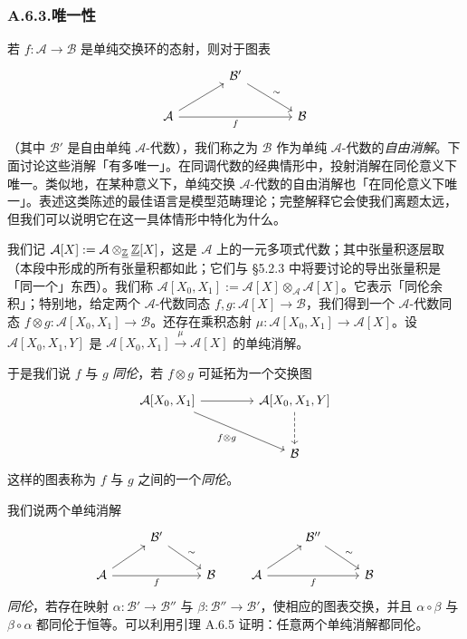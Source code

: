 \subsubsection*{A.6.3.\quad 唯一性}

若 $f\colon\mathcal A\to\mathcal B$ 是单纯交换环的态射，则对于图表
\[
\begin{tikzcd}[column sep=3.6em, row sep=1.8em]
& \mathcal B' \arrow[dr, "{\sim}"] & \\
\mathcal A \arrow[ur] \arrow[rr, "f"'] & & \mathcal B
\end{tikzcd}
\]
（其中 $\mathcal B'$ 是自由单纯 $\mathcal A$-代数），我们称之为 $\mathcal B$ 作为单纯 $\mathcal A$-代数的\emph{自由消解}。下面讨论这些消解「有多唯一」。在同调代数的经典情形中，投射消解在同伦意义下唯一。类似地，在某种意义下，单纯交换 $\mathcal A$-代数的自由消解也「在同伦意义下唯一」。表述这类陈述的最佳语言是模型范畴理论；完整解释它会使我们离题太远，但我们可以说明它在这一具体情形中特化为什么。

我们记 $\mathcal A[X]:=\mathcal A\otimes_{\underline{\mathbb{Z}}}\underline{\mathbb{Z}}[X]$，这是 $\mathcal A$ 上的一元多项式代数；其中张量积逐层取（本段中形成的所有张量积都如此；它们与 §5.2.3 中将要讨论的导出张量积是「同一个」东西）。我们称 $\mathcal A[X_0,X_1]:=\mathcal A[X]\otimes_{\mathcal A}\mathcal A[X]$。它表示「同伦余积」；特别地，给定两个 $\mathcal A$-代数同态 $f,g\colon\mathcal A[X]\to\mathcal B$，我们得到一个 $\mathcal A$-代数同态 $f\otimes g\colon\mathcal A[X_0,X_1]\to\mathcal B$。还存在乘积态射 $\mu\colon\mathcal A[X_0,X_1]\to\mathcal A[X]$。设 $\mathcal A[X_0,X_1,Y]$ 是 $\mathcal A[X_0,X_1]\xrightarrow{\mu}\mathcal A[X]$ 的单纯消解。

于是我们说 $f$ 与 $g$ \emph{同伦}，若 $f\otimes g$ 可延拓为一个交换图
\[
\begin{tikzcd}[column sep=4.2em, row sep=2.6em]
\mathcal A[X_0,X_1] \arrow[r] \arrow[dr, "{f\otimes g}"'] & \mathcal A[X_0,X_1,Y] \arrow[d, dashed] \\
& \mathcal B
\end{tikzcd}
\]
这样的图表称为 $f$ 与 $g$ 之间的一个\emph{同伦}。

我们说两个单纯消解
\[
\begin{tikzcd}[column sep=2.6em, row sep=1.6em]
& \mathcal B' \arrow[dr, "{\sim}"] & \\
\mathcal A \arrow[ur] \arrow[rr, "f"'] & & \mathcal B
\end{tikzcd}
\qquad
\begin{tikzcd}[column sep=2.6em, row sep=1.6em]
& \mathcal B'' \arrow[dr, "{\sim}"] & \\
\mathcal A \arrow[ur] \arrow[rr, "f"'] & & \mathcal B
\end{tikzcd}
\]
\emph{同伦}，若存在映射 $\alpha\colon\mathcal B'\to\mathcal B''$ 与 $\beta\colon\mathcal B''\to\mathcal B'$，使相应的图表交换，并且 $\alpha\circ\beta$ 与 $\beta\circ\alpha$ 都同伦于恒等。可以利用引理 A.6.5 证明：任意两个单纯消解都同伦。

